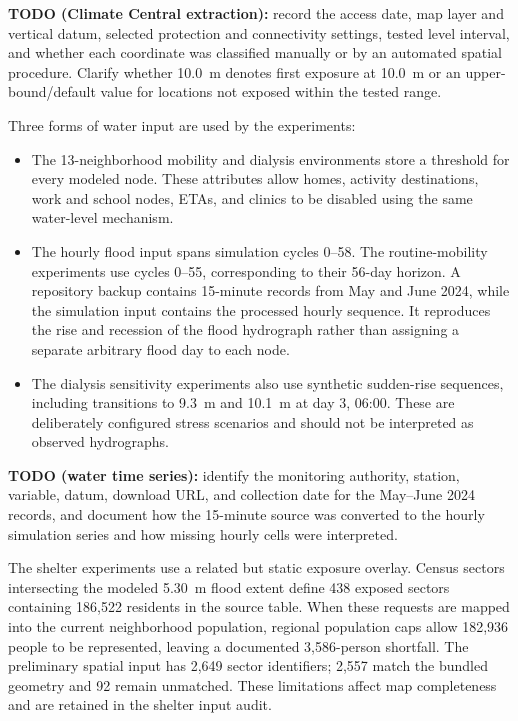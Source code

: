 {\color{red}\textbf{TODO (Climate Central extraction):} record the access date, map layer and vertical datum, selected protection and connectivity settings, tested level interval, and whether each coordinate was classified manually or by an automated spatial procedure. Clarify whether 10.0~m denotes first exposure at 10.0~m or an upper-bound/default value for locations not exposed within the tested range.}

Three forms of water input are used by the experiments:

\begin{itemize}
    \item The 13-neighborhood mobility and dialysis environments store a threshold for every modeled node. These attributes allow homes, activity destinations, work and school nodes, ETAs, and clinics to be disabled using the same water-level mechanism.
    \item The hourly flood input spans simulation cycles 0--58. The routine-mobility experiments use cycles 0--55, corresponding to their 56-day horizon. A repository backup contains 15-minute records from May and June 2024, while the simulation input contains the processed hourly sequence. It reproduces the rise and recession of the flood hydrograph rather than assigning a separate arbitrary flood day to each node.
    \item The dialysis sensitivity experiments also use synthetic sudden-rise sequences, including transitions to 9.3~m and 10.1~m at day 3, 06:00. These are deliberately configured stress scenarios and should not be interpreted as observed hydrographs.
\end{itemize}

{\color{red}\textbf{TODO (water time series):} identify the monitoring authority, station, variable, datum, download URL, and collection date for the May--June 2024 records, and document how the 15-minute source was converted to the hourly simulation series and how missing hourly cells were interpreted.}

The shelter experiments use a related but static exposure overlay. Census sectors intersecting the modeled 5.30~m flood extent define 438 exposed sectors containing 186,522 residents in the source table. When these requests are mapped into the current neighborhood population, regional population caps allow 182,936 people to be represented, leaving a documented 3,586-person shortfall. The preliminary spatial input has 2,649 sector identifiers; 2,557 match the bundled geometry and 92 remain unmatched. These limitations affect map completeness and are retained in the shelter input audit.

